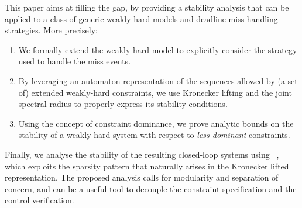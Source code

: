 This paper aims at filling the gap, by providing a stability analysis that can be applied to a class of generic weakly-hard models and deadline miss handling strategies.
More precisely:
\begin{enumerate}[label=(\roman*)]
    \item We formally extend the weakly-hard model to explicitly consider the strategy used to handle the miss events. 
    \item By leveraging an automaton representation of the sequences allowed by (a set of) extended weakly-hard constraints, we use Kronecker lifting and the joint spectral radius to properly express its stability conditions.
    \item Using the concept of constraint dominance, we prove analytic bounds on the stability of a weakly-hard system with respect to \emph{less dominant} constraints.
\end{enumerate}
Finally, we analyse the stability of the resulting closed-loop systems using ~\cite{sparsejsr}, which exploits the sparsity pattern that naturally arises in the Kronecker lifted representation.
The proposed analysis calls for modularity and separation of concern, and can be a useful tool to decouple the constraint specification and the control verification.

